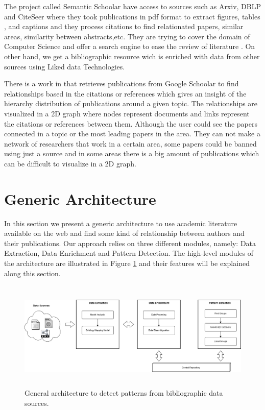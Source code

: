 \documentclass[11pt]{article}
\begin{document}
The project called Semantic Schoolar have access to sources such as Arxiv, DBLP and CiteSeer  where they took publications in pdf format to extract figures, tables , and captions \cite{eps271285} and they process citations to find relationated papers, similar areas, similarity between abstracts,etc. They are trying to cover the domain of Computer Science and offer a search engine to ease the review of literature \cite{AAAIW1510092}. On other hand, we get  a bibliographic resource wich is enriched with data from other sources using Liked data Technologies.

There is a work in \cite{Alfraidi} that retrieves publications from Google Schoolar to find relationships based in the citations or references which gives an insight of the hierarchy distribution of publications around a given topic. The relationships are visualized in a 2D graph where nodes represent documents and links represent the citations or references between them. Although the user could see the papers connected in a topic or the most leading papers in the area. They can not make a network of researchers that work in a  certain area, some papers could be banned using just a source and in some areas there is a big amount of publications which can be difficult to visualize in a 2D graph. 

\section{Generic Architecture}
\label{label:arch}

In this section we present a generic architecture to use academic literature available on the web and find some kind of relationship between authors and their publications. Our approach relies on three different modules, namely: Data Extraction, Data Enrichment and Pattern Detection. The high-level modules of the architecture are illustrated in Figure \ref{fig:achitecture} and their features will be explained along this section.

 \begin{figure}[ht!]
	\centering
		\includegraphics[height=5.2cm]{platformDiagram.png}
	\caption{General architecture to detect patterns from bibliographic data sources.}
	\label{fig:achitecture}
\end{figure}
\end{document}

